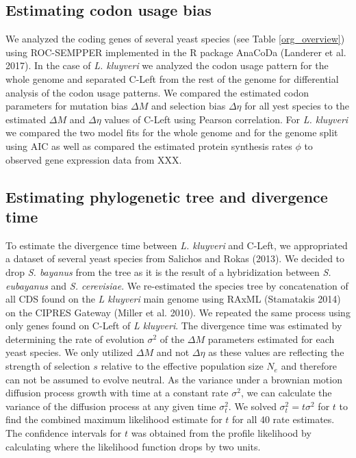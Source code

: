 \documentclass[letter,12pt]{article}
\begin{document}
\subsection{Estimating codon usage bias}
We analyzed the coding genes of several yeast species (see Table \ref{org_overview}) using ROC-SEMPPER \cite{gilchrist2015} implemented in the R package AnaCoDa (Landerer et al. 2017).
In the case of \textit{L. kluyveri} we analyzed the codon usage pattern for the whole genome and separated C-Left from the rest of the genome for differential analysis of the codon usage patterns.
We compared the estimated codon parameters for mutation bias $\Delta M$ and selection bias $\Delta \eta$ for all yest species to the estimated $\Delta M$ and $\Delta \eta$ values of C-Left using Pearson correlation.
For \textit{L. kluyveri} we compared the two model fits for the whole genome and for the genome split using AIC as well as compared the estimated protein synthesis rates $\phi$ to observed gene expression data from XXX.

\subsection{Estimating phylogenetic tree and divergence time}
To estimate the divergence time between \textit{L. kluyveri} and C-Left, we appropriated a dataset of several yeast species from Salichos and Rokas (2013). 
We decided to drop \textit{S. bayanus} from the tree as it is the result of a hybridization between \textit{S. eubayanus} and \textit{S. cerevisiae}.
We re-estimated the species tree by concatenation of all CDS found on the \textit{L kluyveri} main genome using RAxML (Stamatakis 2014) on the CIPRES Gateway (Miller et al. 2010).
We repeated the same process using only genes found on C-Left of \textit{L kluyveri}.
The divergence time was estimated by determining the rate of evolution $\sigma^2$ of the $\Delta M$ parameters estimated for each yeast species.
We only utilized $\Delta M$ and not $\Delta \eta$ as these values are reflecting the strength of selection $s$ relative to the effective population size $N_e$ and therefore can not be assumed to evolve neutral.
As the variance under a brownian motion diffusion process growth with time at a constant rate $\sigma^2$, we can calculate the variance of the diffusion process at any given time $\sigma^2_t$. 
We solved $\sigma^2_t = t\sigma^2$ for $t$ to find the combined maximum likelihood estimate for $t$ for all 40 rate estimates.
The confidence intervals for $t$ was obtained from the profile likelihood by calculating where the likelihood function drops by two units.
  
\end{document}
